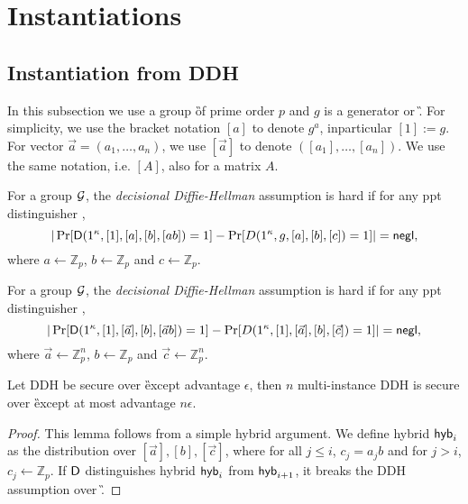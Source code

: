 \section{Instantiations}
\newcommand{\Z}{\ensuremath{\mathbb Z}\xspace}

\subsection{Instantiation from DDH}

In this subsection we use a group \G of prime order $p$ and $g$ is a generator or \G. For simplicity, we use the bracket notation $[a]$ to denote $g^a$, inparticular $[1]:=g$. For vector $\vec{a}=(a_1,\ldots,a_n)$, we use $[\vec{a}]$ to denote $([a_1],\ldots,[a_n])$. We use the same notation, i.e. $[A]$, also for a matrix $A$.

\begin{definition}
For a group $\mathcal{G}$, the \emph{decisional Diffie-Hellman} assumption is hard if for any ppt distinguisher \D,
$$
|\Pr[\mathsf D(1^\kappa,[1],[a],[b],[ab])=1]-\Pr[D(1^\kappa,g,[a],[b],[c])=1]|=\mathsf{negl},
$$
where $a\leftarrow\Z_p$, $b\leftarrow\Z_p$ and $c\leftarrow\Z_p$.
\end{definition}

\begin{definition}
For a group $\mathcal{G}$, the \emph{decisional Diffie-Hellman} assumption is hard if for any ppt distinguisher \D,
$$
|\Pr[\mathsf D(1^\kappa,[1],[\vec{a}],[b],[\vec{a}b])=1]-\Pr[D(1^\kappa,[1],[\vec{a}],[b],[\vec{c}])=1]|=\mathsf{negl},
$$
where $\vec{a}\leftarrow\Z_p^n$, $b\leftarrow\Z_p$ and $\vec{c}\leftarrow\Z_p^n$.
\end{definition}

\begin{lemma}\label{lem:DHuniform}
Let DDH be secure over \G except advantage $\epsilon$, then $n$ multi-instance DDH is secure over \G except at most advantage $n\epsilon$.
\end{lemma}

\begin{proof}
This lemma follows from a simple hybrid argument. We define hybrid $\mathsf{hyb}_i$ as the distribution over $[\vec{a}],[b],[\vec{c}]$, where for all $j\leq i$, $c_j=a_jb$ and for $j>i$, $c_j\leftarrow\Z_p$. If $\mathsf D$ distinguishes hybrid $\mathsf{hyb}_i$ from $\mathsf{hyb}_{i+1}$, it breaks the DDH assumption over \G.
\end{proof}


